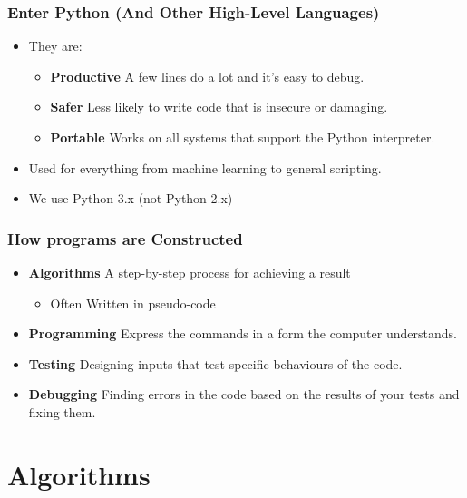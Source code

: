 \documentclass{beamer}
\begin{document}
%
%
\begin{frame}
  \frametitle{Enter Python (And Other High-Level Languages)}
  \begin{itemize}
    \item They are:
      \begin{itemize}
        \item \textbf{Productive} \textrightarrow A few lines do a lot and it's easy to debug.
        \item \textbf{Safer} \textrightarrow Less likely to write code that is insecure or damaging.
        \item \textbf{Portable} \textrightarrow Works on all systems that support the Python interpreter.
      \end{itemize}
    \item Used for everything from machine learning to general scripting.
    \item We use Python 3.x (not Python 2.x)
  \end{itemize}
\end{frame}

%
%
\begin{frame}
  \frametitle{How programs are Constructed}
  \begin{itemize}
    \item \textbf{Algorithms} \textrightarrow A step-by-step process for achieving a result
      \begin{itemize}
        \item Often Written in pseudo-code
      \end{itemize}
    \item \textbf{Programming} \textrightarrow Express the commands in a form the computer understands.
  \item \textbf{Testing} \textrightarrow Designing inputs that test specific behaviours of the code.
  \item \textbf{Debugging} \textrightarrow Finding errors in the code based on the results of your tests and fixing them.
  \end{itemize}
\end{frame}


%
%
\section{Algorithms}


%
%
%
\end{document}
